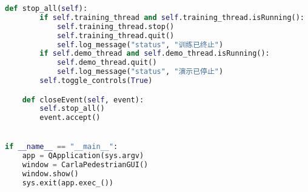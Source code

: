 \begin{lstlisting}[language=Python]
    def stop_all(self):
        if self.training_thread and self.training_thread.isRunning():
            self.training_thread.stop()
            self.training_thread.quit()
            self.log_message("status", "训练已终止")
        if self.demo_thread and self.demo_thread.isRunning():
            self.demo_thread.quit()
            self.log_message("status", "演示已停止")
        self.toggle_controls(True)

    def closeEvent(self, event):
        self.stop_all()
        event.accept()


if __name__ == "__main__":
    app = QApplication(sys.argv)
    window = CarlaPedestrianGUI()
    window.show()
    sys.exit(app.exec_())
\end{lstlisting}
